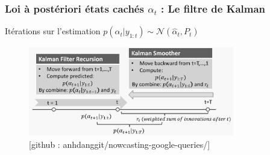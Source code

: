     




\begin{frame}
    \frametitle{Loi à postériori états cachés $\alpha_t$ : Le filtre de Kalman }
    \centering
    Itérations sur l'estimation $p(\alpha_{t} | y_{1: t}) \sim \mathcal{N}(\hat{\alpha}_{t}, P_t)$
    \begin{figure}
        \includegraphics[width=0.8\textwidth]{Figures/kalman_filter.png}
        \caption{[github : anhdanggit/nowcasting-google-queries/]}
    \end{figure}
    
    
\end{frame}

